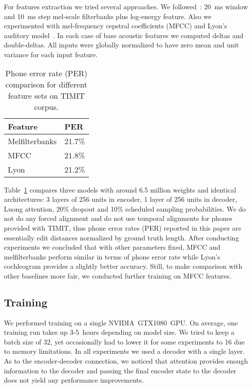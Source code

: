 \documentclass[a4paper]{article}
\begin{document}
For features extraction we tried several approaches. We followed~\cite{Graves2013}: 20~ms window and 10~ms step mel-scale filterbanks plus log-energy feature. Also we experimented with mel-frequency cepstral coefficients (MFCC) and Lyon's auditory model~\cite{Lyon-1982}. In each case of base acoustic features we computed deltas and double-deltas. All inputs were globally normalized to have zero mean and unit variance for each input feature.

\begin{table}[th]
  \caption{Phone error rate (PER) comparison for different feature sets on TIMIT corpus.}
  \label{tab:FeaturesTimit}
\centering
  \begin{tabular}{ll}
    \toprule
    \textbf{Feature} & \textbf{PER} \\
    \midrule
    Melfilterbanks & 21.7\% \\
    MFCC & 21.8\% \\
    Lyon & 21.2\% \\
    \bottomrule
  \end{tabular}
\end{table}

Table~\ref{tab:FeaturesTimit} compares three models with around 6.5 million weights and identical architectures: 3 layers of 256 units in encoder, 1 layer of 256 units in decoder, Luong attention, 20\% dropout and 10\% scheduled sampling probabilities. We do not do any forced alignment and do not use temporal alignments for phones provided with TIMIT, thus phone error rates (PER) reported in this paper are essentially edit distances normalized by ground truth length. After conducting experiments we concluded that with other parameters fixed, MFCC and melfilterbanks perform similar in terms of phone error rate while Lyon's cochleogram provides a slightly better accuracy. Still, to make comparison with other baselines more fair, we conducted further training on MFCC features.

\subsection{Training}
We performed training on a single NVIDIA~GTX1080~GPU. On average, one training run takes up 3-5~hours depending on model size. We tried to keep a batch size of 32, yet occasionally had to lower it for some experiments to 16 due to memory limitations. In all experiments we used a decoder with a single layer. As to the encoder-decoder connection, we noticed that attention provides enough information to the decoder and passing the final encoder state to the decoder does not yield any performance improvements.
\end{document}
